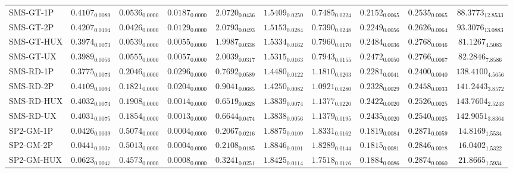 \begin{longtable}{@{}lccccccccc@{}}
SMS-GT-1P & $0.4107_{0.0089}$ & $0.0536_{0.0000}$ & $0.0187_{0.0000}$ & $2.0720_{0.0436}$ & $1.5409_{0.0250}$ & $0.7485_{0.0224}$ & $0.2152_{0.0065}$ & $0.2535_{0.0065}$ & $88.3773_{12.8533}$ \\
SMS-GT-2P & $0.4207_{0.0104}$ & $\mathbf{0.0426}_{0.0000}$ & $0.0129_{0.0000}$ & $2.0793_{0.0493}$ & $1.5153_{0.0284}$ & $0.7390_{0.0248}$ & $0.2249_{0.0056}$ & $0.2626_{0.0064}$ & $93.3076_{13.0883}$ \\
SMS-GT-HUX & $0.3974_{0.0073}$ & $0.0539_{0.0000}$ & $0.0055_{0.0000}$ & $1.9987_{0.0338}$ & $1.5334_{0.0162}$ & $0.7960_{0.0170}$ & $\mathbf{0.2484}_{0.0036}$ & $0.2768_{0.0046}$ & $81.1267_{4.5083}$ \\
SMS-GT-UX & $0.3989_{0.0056}$ & $0.0555_{0.0000}$ & $0.0057_{0.0000}$ & $2.0039_{0.0317}$ & $1.5315_{0.0163}$ & $0.7943_{0.0155}$ & $\mathbf{0.2472}_{0.0050}$ & $0.2766_{0.0067}$ & $82.2846_{7.8586}$ \\
SMS-RD-1P & $0.3775_{0.0073}$ & $0.2046_{0.0000}$ & $0.0296_{0.0000}$ & $0.7692_{0.0589}$ & $1.4480_{0.0122}$ & $1.1810_{0.0203}$ & $0.2281_{0.0041}$ & $0.2400_{0.0040}$ & $138.4100_{4.5656}$ \\
SMS-RD-2P & $0.4109_{0.0094}$ & $0.1821_{0.0000}$ & $0.0204_{0.0000}$ & $0.9041_{0.0685}$ & $1.4250_{0.0082}$ & $1.0921_{0.0280}$ & $\mathbf{0.2328}_{0.0029}$ & $0.2458_{0.0033}$ & $141.2443_{3.8572}$ \\
SMS-RD-HUX & $0.4032_{0.0074}$ & $0.1908_{0.0000}$ & $0.0014_{0.0000}$ & $0.6519_{0.0628}$ & $\mathbf{1.3839}_{0.0074}$ & $1.1377_{0.0220}$ & $\mathbf{0.2422}_{0.0020}$ & $0.2526_{0.0025}$ & $\mathbf{143.7604}_{2.5243}$ \\
SMS-RD-UX & $0.4031_{0.0075}$ & $0.1854_{0.0000}$ & $0.0013_{0.0000}$ & $0.6644_{0.0474}$ & $\mathbf{1.3838}_{0.0056}$ & $1.1379_{0.0195}$ & $\mathbf{0.2435}_{0.0020}$ & $0.2540_{0.0025}$ & $\mathbf{142.9051}_{3.8364}$ \\
SP2-GM-1P & $0.0426_{0.0039}$ & $0.5074_{0.0000}$ & $0.0004_{0.0000}$ & $0.2067_{0.0216}$ & $1.8875_{0.0109}$ & $1.8331_{0.0162}$ & $0.1819_{0.0084}$ & $\mathbf{0.2871}_{0.0059}$ & $14.8169_{1.5534}$ \\
SP2-GM-2P & $0.0441_{0.0037}$ & $0.5013_{0.0000}$ & $0.0004_{0.0000}$ & $0.2108_{0.0185}$ & $1.8846_{0.0101}$ & $1.8289_{0.0144}$ & $0.1815_{0.0081}$ & $0.2846_{0.0078}$ & $16.0402_{1.5322}$ \\
SP2-GM-HUX & $0.0623_{0.0047}$ & $0.4573_{0.0000}$ & $0.0008_{0.0000}$ & $0.3241_{0.0251}$ & $1.8425_{0.0114}$ & $1.7518_{0.0176}$ & $0.1884_{0.0086}$ & $\mathbf{0.2874}_{0.0060}$ & $21.8665_{1.5934}$ \\

\end{longtable}
